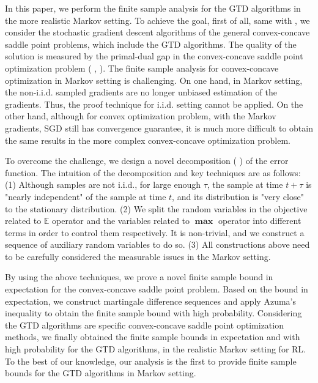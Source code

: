 \documentclass[twoside,11pt]{article}
\numberwithin{equation}{section}
\newcommand{\E}{\mathbb{E}}
\begin{document}
	In this paper, we perform the finite sample analysis for the GTD algorithms in the more realistic Markov setting. To achieve the goal, first of all, same with \cite{liu2015finite}, we consider the stochastic gradient descent algorithms of the general convex-concave saddle point problems, which include the GTD algorithms. The quality of the solution is measured by the primal-dual gap in the convex-concave saddle point optimization problem (\cite{liu2015finite} , \cite{nemirovski2009robust}).	
	The   finite sample analysis for convex-concave optimization in Markov setting is challenging. On one hand, in Markov setting, the non-i.i.d. sampled gradients are no longer unbiased estimation of the gradients. Thus, the proof technique for i.i.d. setting cannot be applied. On the other hand, although for convex optimization problem, with the Markov gradients, SGD still has convergence guarantee, it is much more difficult to obtain the same results in the more complex convex-concave optimization problem.  
	
	
	To overcome the challenge, we design a novel decomposition ( ) of the error function. The intuition of the decomposition and key techniques are as follows:  {(1)} Although samples are not i.i.d., for large enough $ \tau $, the sample at time $t+\tau$ is "nearly independent"  of the sample  at time $t$, and its distribution is "very close" to the stationary distribution.  {(2)} We split the random variables in the objective related to $ \mathbf{\E} $ operator and the variables related to $ \mathbf{\max} $ operator into different terms in order to control them respectively. It is non-trivial, and we construct a sequence of auxiliary random variables to do so.  {(3)} All constructions above need to be carefully considered the measurable issues in the Markov setting. 
	
	By using the above techniques, we prove a novel finite sample bound in expectation for the convex-concave saddle point problem. Based on the bound in expectation, we construct martingale difference sequences and apply Azuma's inequality to obtain the finite sample bound with high probability. Considering the GTD algorithms are specific convex-concave saddle point optimization methods, we finally obtained the finite sample bounds in expectation and with high probability for the GTD algorithms, in the realistic Markov setting for RL. To the best of our knowledge, our analysis is the first to provide finite sample bounds for the GTD algorithms in Markov setting.
	
\end{document}
